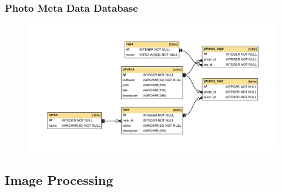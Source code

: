 \documentclass[]{beamer}
\begin{document}
    \begin{frame}[plain]
        \frametitle{Photo Meta Data Database}

        \begin{figure}[h]
        \centering
        \includegraphics[width=\textwidth]{meta-db-diagram}
        \end{figure}
    \end{frame}

    \subsection{Image Processing}
\end{document}
